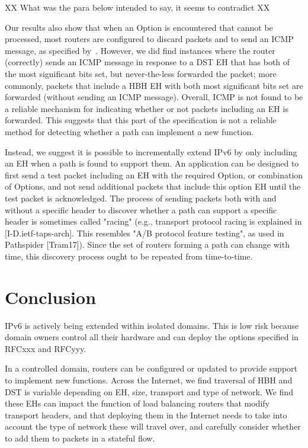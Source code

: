\documentclass[conference]{IEEEtran}
\begin{document}
XX What was the para below intended to say, it seems to contradict XX

Our results also show that when an Option is encountered that cannot be processed,
most routers are configured to discard packets and to send an ICMP message, as specified by~\cite{RFC4443}. However, we did find instances where the router (correctly) sends an ICMP message in response to a DST EH that has both of the most significant bits set, but never-the-less forwarded the packet; more commonly, packets that include a HBH EH with both most significant bits set are forwarded (without sending an ICMP message). Overall, ICMP is not found to be a reliable mechanism for indicating whether or not packets including an EH is forwarded. This suggests that this part of the specification is not a  reliable method for detecting whether a path can implement a new function.

Instead, we suggest it is possible to incrementally extend IPv6 by only including an EH when a path is found to support them. 
An application can be designed to first send a test packet including an EH with the required Option, or combination of Options, and not send additional packets that include this option EH until the test packet is acknowledged. The process of sending packets both with and without a specific header to discover whether a path can support a specific header is sometimes called "racing" (e.g., transport protocol racing is explained in [I-D.ietf-taps-arch]. This resembles "A/B protocol feature testing", as used in Pathspider [Tram17]).
Since the set of routers forming a path can change with time, this
discovery process ought to be repeated from time-to-time. 

\section{Conclusion}
\label{sec:conclusion}


IPv6 is actively being extended within isolated domains. This is low risk because domain owners control all their hardware and can deploy the options specified in RFCxxx and RFCyyy.

In a controlled domain, routers can be configured or updated to provide support to implement new functions. 
Across the Internet, we find traversal of HBH and DST is variable depending on EH, size, transport and type of network. We find these EHs can impact the function of load balancing routers that modify transport headers, and that deploying them in the Internet needs to take into account the type of network these will travel over, and carefully consider whether to add them to packets in a stateful flow.
\end{document}
